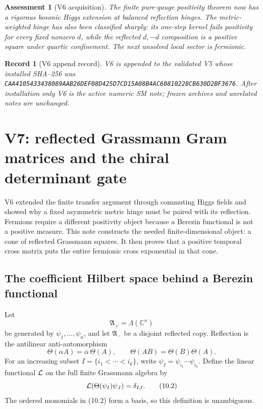 \documentclass[11pt]{article}
\newtheorem{assessment}[theorem]{Assessment}
\newtheorem{record}[theorem]{Record}
\theoremstyle{remark}
\begin{document}
\begin{assessment}[V6 acquisition]
\label{ass:v19v6}
The finite pure-gauge positivity theorem now has a rigorous bosonic Higgs
extension at balanced reflection hinges.  The metric-weighted hinge has
also been classified sharply: its one-step kernel fails positivity for
every fixed nonzero \(d\), while the reflected \(d,-d\) composition is a
positive square under quartic confinement.  The next unsolved local sector
is fermionic.
\end{assessment}

\begin{record}[V6 append record]
\label{rec:v19v6}
V6 is appended to the validated V5 whose installed SHA--256 was
\texttt{CAA4105433438089AAB26DEF08D425D7CD15A08B4AC60810228CB630D2BF3676}.
After installation only V6 is the active numeric SM note; frozen archives
and unrelated notes are unchanged.
\end{record}



\section{V7: reflected Grassmann Gram matrices and the chiral determinant gate}
\label{sec:v19v7}

V6 extended the finite transfer argument through commuting Higgs fields and
showed why a fixed asymmetric metric hinge must be paired with its
reflection.  Fermions require a different positivity object because a
Berezin functional is not a positive measure.  This note constructs the
needed finite-dimensional object: a cone of reflected Grassmann squares.
It then proves that a positive temporal cross matrix puts the entire
fermionic cross exponential in that cone.

\subsection{The coefficient Hilbert space behind a Berezin functional}

Let
\[
 {\mathfrak A}_+=\Lambda(\mathbb C^n)
\]
be generated by \(\psi_1,\ldots,\psi_n\), and let
\({\mathfrak A}_-\) be a disjoint reflected copy.  Reflection is the
antilinear anti-automorphism
\[
 \Theta(\alpha A)=\overline\alpha\,\Theta(A),\qquad
 \Theta(AB)=\Theta(B)\Theta(A).                                \tag{10.1}
\]
For an increasing subset \(I=\{i_1<\cdots<i_k\}\), write
\(\psi_I=\psi_{i_1}\cdots\psi_{i_k}\).  Define the linear functional
\({\cal L}\) on the full finite Grassmann algebra by
\[
 {\cal L}\!\left(\Theta(\psi_I)\psi_J\right)=\delta_{IJ}.       \tag{10.2}
\]
The ordered monomials in (10.2) form a basis, so this definition is
unambiguous.
\end{document}
